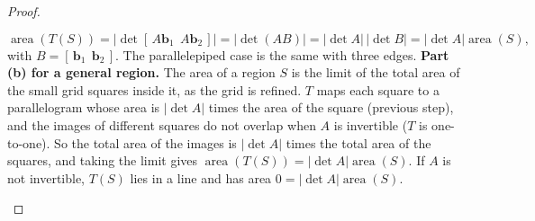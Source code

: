 \documentclass[10pt]{scrartcl}
\newcommand{\vv}[1]{\mathbf{#1}}
\begin{document}
\begin{proof}
\begin{steps}
    \[
      \operatorname{area}(T(S))=|\det[\,A\vv b_1\ \ A\vv b_2\,]|=|\det(AB)|=|\det A|\,|\det B|=|\det A|\operatorname{area}(S),
    \]
    with $B=[\,\vv b_1\ \ \vv b_2\,]$. The parallelepiped case is the same with three edges.
    \ii \textbf{Part (b) for a general region.} The area of a region $S$ is the limit of the total area of the small grid squares inside it, as the grid is refined. $T$ maps each square to a parallelogram whose area is $|\det A|$ times the area of the square (previous step), and the images of different squares do not overlap when $A$ is invertible ($T$ is one-to-one). So the total area of the images is $|\det A|$ times the total area of the squares, and taking the limit gives $\operatorname{area}(T(S))=|\det A|\operatorname{area}(S)$. If $A$ is not invertible, $T(S)$ lies in a line and has area $0=|\det A|\operatorname{area}(S)$.
  \end{steps}
\end{proof}
\end{document}
